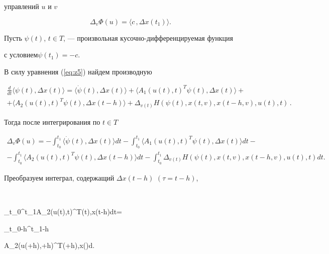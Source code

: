 управлений $u$ и $v$


$$


\Delta_v\Phi(u)=\langle c\,,\Delta x(t_1)\rangle .


$$





Пусть $\psi(t)$, $t\in T$, --- произвольная кусочно-дифференцируемая функция


с условием\linebreak $\psi(t_1)=-c$.


В силу уравнения (\ref{eq:z5}) найдем производную


\begin{multline*}


\frac{d}{dt}\langle \psi(t),\Delta x(t)\rangle


=\langle \Dot{\psi}(t),\Delta x(t)\rangle +


\langle A_1(u(t),t)^T\psi(t),\Delta x(t)\rangle + \\


%


+\langle A_2(u(t),t)^T\psi(t),\Delta x(t-h)\rangle +


\Delta_{v(t)}H(\psi(t),x(t,v),x(t-h,v),u(t),t)\,.


\end{multline*}


Тогда после интегрирования по $t\in T$


\begin{multline*}


\Delta_v\Phi(u)=-\int_{t_0}^{t_1}


\langle \Dot{\psi}(t),\Delta x(t)\rangle dt-


\int_{t_0}^{t_1}\langle A_1(u(t),t)^T\psi(t),\Delta x(t)\rangle dt- \\


%


-\int_{t_0}^{t_1}\langle A_2(u(t),t)^T\psi(t),\Delta x(t-h)\rangle dt-


\int_{t_0}^{t_1}\Delta_{v(t)}H(\psi(t),x(t,v),x(t-h,v),u(t),t)dt.


\end{multline*}


Преобразуем интеграл, содержащий $\Delta x(t-h)$ $(\tau=t-h)$,


$$


\int_{t_0}^{t_1}\langle A_2(u(t),t)^T\psi(t),\Delta x(t-h)\rangle dt=


\int\limits_{t_0-h}^{t_1-h}


\langle A_2(u(\tau+h),\tau+h)^T\psi(\tau+h),\Delta x(\tau)\rangle d\tau.


